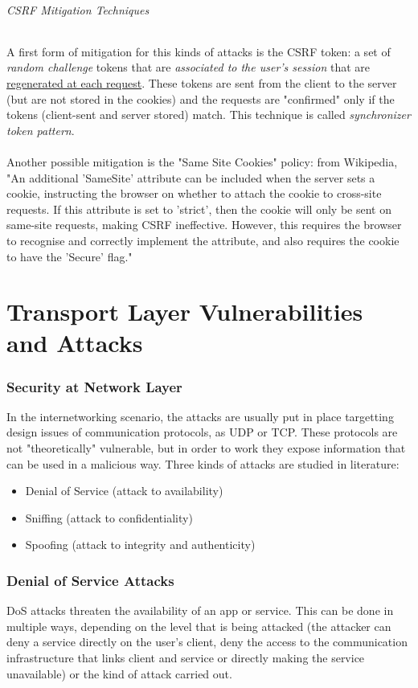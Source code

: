 \documentclass{article}
\begin{document}
					\paragraph{CSRF Mitigation Techniques}
						A first form of mitigation for this kinds of attacks is the CSRF token: a set of \emph{random challenge} tokens that are \emph{associated to the user's session} that are \underline{regenerated at each request}. These tokens are sent from the client to the server (but are not stored in the cookies) and the requests are "confirmed" only if the tokens (client-sent and server stored) match. This technique is called \emph{synchronizer token pattern}.\\\\
						Another possible mitigation is the "Same Site Cookies" policy: from Wikipedia, "An additional 'SameSite' attribute can be included when the server sets a cookie, instructing the browser on whether to attach the cookie to cross-site requests. If this attribute is set to 'strict', then the cookie will only be sent on same-site requests, making CSRF ineffective. However, this requires the browser to recognise and correctly implement the attribute, and also requires the cookie to have the 'Secure' flag."
	 
	\clearpage \part{Transport Layer Vulnerabilities and Attacks}
		\section{Security at Network Layer}
			In the internetworking scenario, the attacks are usually put in place targetting design issues of communication protocols, as UDP or TCP. These protocols are not "theoretically" vulnerable, but in order to work they expose information that can be used in a malicious way. Three kinds of attacks are studied in literature:
			\begin{itemize}
				\item Denial of Service (attack to availability)
				\item Sniffing (attack to confidentiality)
				\item Spoofing (attack to integrity and authenticity)
			\end{itemize}
			
		\section{Denial of Service Attacks}
			DoS attacks threaten the availability of an app or service. This can be done in multiple ways, depending on the level that is being attacked (the attacker can deny a service directly on the user's client, deny the access to the communication infrastructure that links client and service or directly making the service unavailable) or the kind of attack carried out.
			
\end{document}
